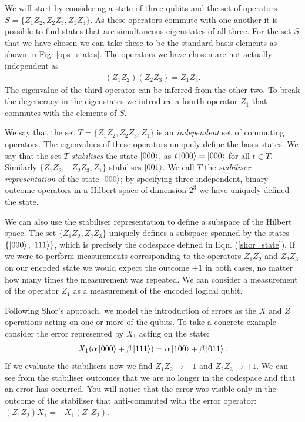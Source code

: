 We will start by considering a state of three qubits and the set of operators $S = \{Z_1Z_2, Z_2Z_3, Z_1Z_3\}$. As these operators commute with one another it is possible to find states that are simultaneous eigenstates of all three. For the set $S$ that we have chosen we can take these to be the standard basis elements as shown in Fig. \ref{ops_states}. The operators we have chosen are not actually independent as
\begin{align}
  (Z_1Z_2)(Z_2Z_3) = Z_1Z_3.
\end{align}
The eigenvalue of the third operator can be inferred from the other two. To break the degeneracy in the eigenstates we introduce a fourth operator $Z_1$ that commutes with the elements of $S$.

We say that the set $T = \{Z_1Z_2, Z_2Z_3, Z_1\}$ is an \textit{independent} set of commuting operators. The eigenvalues of these operators uniquely define the basis states. We say that the set $T$ \textit{stabilises} the state $\left\vert000\right\rangle$, as $t\left\vert000\right\rangle = \left\vert000\right\rangle$ for all $t\in T$. Similarly $\{Z_1Z_2, -Z_2Z_3, Z_1\}$ stabilises $\left\vert001\right\rangle$. We call $T$ the \textit{stabiliser representation} of the state $\left\vert000\right\rangle$; by specifying three independent, binary-outcome operators in a Hilbert space of dimension $2^3$ we have uniquely defined the state.

We can also use the stabiliser representation to define a subspace of the Hilbert space. The set $\{Z_1Z_2, Z_2Z_3\}$ uniquely defines a subspace spanned by the states $\{\left\vert000\right\rangle, \left\vert111\right\rangle\}$, which is precisely the codespace defined in Eqn. (\ref{shor_state}). If we were to perform measurements corresponding to the operators $Z_1Z_2$ and $Z_2Z_3$ on our encoded state we would expect the outcome $+1$ in both cases, no matter how many times the measurement was repeated. We can consider a measurement of the operator $Z_1$ as a measurement of the encoded logical qubit.

Following Shor's approach, we model the introduction of errors as the $X$ and $Z$ operations acting on one or more of the qubits. To take a concrete example consider the error represented by $X_1$ acting on the state:
\begin{align}
  X_1 (\alpha\left\vert000\right\rangle + \beta\left\vert111\right\rangle) = \alpha\left\vert100\right\rangle + \beta\left\vert011\right\rangle.
\end{align}
If we evaluate the stabilisers now we find $Z_1Z_2 \rightarrow -1$ and $Z_2 Z_3 \rightarrow +1$. We can see from the stabiliser outcomes that we are no longer in the codespace and that an error has occurred. You will notice that the error was visible only in the outcome of the stabiliser that anti-commuted with the error operator: $(Z_1Z_2)X_1 = -X_1(Z_1Z_2)$.

